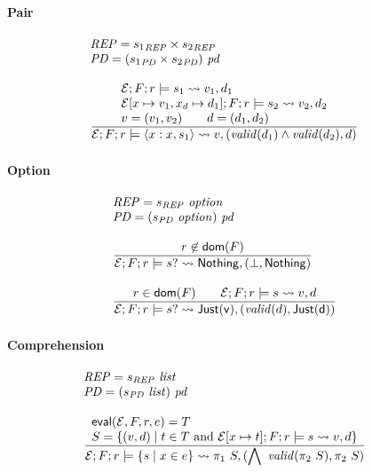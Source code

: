 \documentclass[nocopyrightspace,natbib]{sigplanconf}
\begin{document}
\paragraph*{Pair}
\[
\begin{array}{l}
\REP = {s_1}_\REP \times {s_2}_\REP\\
\PD = \pd{{s_1}_\PD \times {s_2}_\PD}\\
\\
\infrule
{ \begin{array}{l}
  \Env;F;r \models s_1 \yields v_1,d_1 \\
  \Env[x \mapsto v_1, x_d \mapsto d_1];F;r \models s_2 \yields v_2,d_2 \\
  v = (v_1,v_2) \qquad d = (d_1,d_2) 
  \end{array} }
{ \Env;F;r \models \SPair{x}{s_1}{s_2} \yields v,(\valid{d_1} \wedge \valid{d_2}, d) }
{ }
\end{array}
\]

\paragraph*{Option}
\[
\begin{array}{l}
\REP = s_\REP~\typ{option}\\
\PD = \pd{s_\PD~\typ{option}}\\
\\
\infrule
{ r \not\in \dom{F} }
{ \Env;F;r \models \SOption{s} \yields \Nothing,(\bot,\Nothing) }
{ }\\
\\
\infrule
{ r \in \dom{F} \qquad \Env;F;r \models s \yields v,d }
{ \Env;F;r \models \SOption{s} \yields \Just{v},(\valid{d},\Just{d}) }
{ }
\end{array}
\]

\paragraph*{Comprehension}
\[
\begin{array}{l}
\REP = s_\REP~\typ{list}\\
\PD = \pd{s_\PD~\typ{list}}\\
\\
\infrule
{ \begin{array}{l}
  \eval{\Env,F,r,e} = T \\
  S = \Set{ (v,d) \mid t \in T \text{ and } \Env[x \mapsto t];F;r \models s \yields v,d }
  \end{array} }
{ \Env;F;r \models \SSetComp{s}{x}{e} \yields \pi_1~S,(\bigwedge~\valid{\pi_2~S}, \pi_2~S) }
{ }
\end{array}
\]
\end{document}
